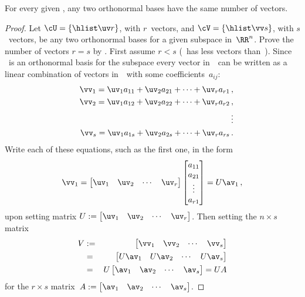 \begin{theorem} \label{thm:sameD} 
For every given , any two orthonormal bases have the same number of vectors.
\end{theorem}
\begin{proof} 
Let \(\cU=\{\hlist\uv r\}\), with \(r\)~vectors, and \(\cV=\{\hlist\vv s\}\), with \(s\)~vectors, be any two orthonormal bases for a given subspace in~\(\RR^n\).
Prove the number of vectors \(r=s\) by .
First assume \(r<s\) (\cU\ has less vectors than~\cV).
Since \cU\ is an orthonormal basis for the subspace every vector in~\cV\ can be written as a linear combination of vectors in~\cU\ with some coefficients~\(a_{ij}\):
\begin{eqnarray*}
  &&\vv_1=\uv_1a_{11}+\uv_2a_{21}+\cdots+\uv_ra_{r1}\,,
\\&&\vv_2=\uv_1a_{12}+\uv_2a_{22}+\cdots+\uv_ra_{r2}\,,
\\&&\qquad\vdots
\\&&\vv_s=\uv_1a_{1s}+\uv_2a_{2s}+\cdots+\uv_ra_{rs}\,.
\end{eqnarray*}
Write each of these equations, such as the first one, in the form
\begin{equation*}
\vv_1=\begin{bmatrix} \uv_1&\uv_2&\cdots&\uv_r \end{bmatrix}
\begin{bmatrix} a_{11}\\a_{21}\\\vdots\\a_{r1} \end{bmatrix}
=U\av_1\,,
\end{equation*}
upon setting matrix \(U:=\begin{bmatrix} \uv_1&\uv_2&\cdots&\uv_r \end{bmatrix}\).
Then setting the \(n\times s\) matrix
\begin{eqnarray*}
V&:=&\begin{bmatrix} \vv_1&\vv_2&\cdots&\vv_s \end{bmatrix}
\\&=&\begin{bmatrix} U\av_1& U\av_2&\cdots&U\av_s\end{bmatrix}
\\&=&U\begin{bmatrix} \av_1& \av_2&\cdots&\av_s\end{bmatrix}
=UA
\end{eqnarray*}
for the \(r\times s\) matrix~\(A:=\begin{bmatrix} \av_1& \av_2&\cdots&\av_s \end{bmatrix}\).

\end{proof}
